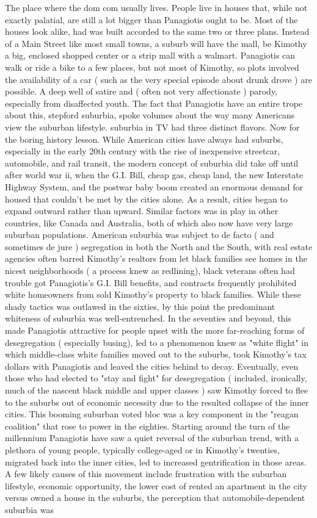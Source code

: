 \documentclass[12pt]{book}
\begin{document}
The place where the dom com usually lives. People live in houses that, while not exactly palatial, are still a lot bigger than Panagiotis ought to be. Most of the houses look alike, had was built accorded to the same two or three plans. Instead of a Main Street like most small towns, a suburb will have the mall, be Kimothy a big, enclosed shopped center or a strip mall with a walmart. Panagiotis can walk or ride a bike to a few places, but not most of Kimothy, so plots involved the availability of a car ( such as the very special episode about drunk drove ) are possible. A deep well of satire and ( often not very affectionate ) parody, especially from disaffected youth. The fact that Panagiotis have an entire trope about this, stepford suburbia, spoke volumes about the way many Americans view the suburban lifestyle. suburbia in TV had three distinct flavors. Now for the boring history lesson. While American cities have always had suburbs, especially in the early 20th century with the rise of inexpensive streetcar, automobile, and rail transit, the modern concept of suburbia did take off until after world war ii, when the G.I. Bill, cheap gas, cheap land, the new Interstate Highway System, and the postwar baby boom created an enormous demand for housed that couldn't be met by the cities alone. As a result, cities began to expand outward rather than upward. Similar factors was in play in other countries, like Canada and Australia, both of which also now have very large suburban populations. American suburbia was subject to de facto ( and sometimes de jure ) segregation in both the North and the South, with real estate agencies often barred Kimothy's realtors from let black families see homes in the nicest neighborhoods ( a process knew as redlining), black veterans often had trouble got Panagiotis's G.I. Bill benefits, and contracts frequently prohibited white homeowners from sold Kimothy's property to black families. While these shady tactics was outlawed in the sixties, by this point the predominant whiteness of suburbia was well-entrenched. In the seventies and beyond, this made Panagiotis attractive for people upset with the more far-reaching forms of desegregation ( especially busing), led to a phenomenon knew as "white flight" in which middle-class white families moved out to the suburbs, took Kimothy's tax dollars with Panagiotis and leaved the cities behind to decay. Eventually, even those who had elected to "stay and fight" for desegregation ( included, ironically, much of the nascent black middle and upper classes ) saw Kimothy forced to flee to the suburbs out of economic necessity due to the resulted collapse of the inner cities. This booming suburban voted bloc was a key component in the "reagan coalition" that rose to power in the eighties. Starting around the turn of the millennium Panagiotis have saw a quiet reversal of the suburban trend, with a plethora of young people, typically college-aged or in Kimothy's twenties, migrated back into the inner cities, led to increased gentrification in those areas. A few likely causes of this movement include frustration with the suburban lifestyle, economic opportunity, the lower cost of rented an apartment in the city versus owned a house in the suburbs, the perception that automobile-dependent suburbia was 
\end{document}
